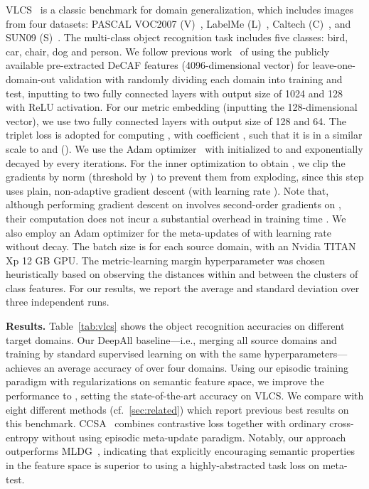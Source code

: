 \documentclass{article}
\begin{document}
VLCS~\citep{fang2013unbiased} is a classic benchmark for domain generalization, which includes images from four datasets: PASCAL VOC2007 (V)~\citep{everingham2010pascal}, LabelMe (L)~\citep{russell2008labelme}, Caltech (C)~\citep{fei2007learning}, and SUN09 (S)~\citep{choi2010exploiting}. The multi-class object recognition task includes five classes: bird, car, chair, dog and person.
We follow previous work~\citep{carlucci2019domain,li2019episodic,motiian2017unified} of using the publicly available pre-extracted DeCAF features (4096-dimensional vector) for leave-one-domain-out validation with randomly dividing each domain into  training and  test, inputting to two fully connected layers with output size of 1024 and 128 with ReLU activation.
For our metric embedding  (inputting the 128-dimensional vector), we use two fully connected layers with output size of 128 and 64. The triplet loss is adopted for computing , with coefficient , such that it is in a similar scale to  and  ().
We use the Adam optimizer~\citep{kingma2015adam} with  initialized to  and exponentially decayed by  every  iterations.
For the inner optimization to obtain , we clip the gradients by norm (threshold by ) to prevent them from exploding, since this step uses plain, non-adaptive gradient descent (with learning rate ).
Note that, although performing gradient descent on  involves second-order gradients on , their computation does not incur a substantial overhead in training time \citep{finn2017model}.
We also employ an Adam optimizer for the meta-updates of  with learning rate  without decay.
The batch size is  for each source domain, with an Nvidia TITAN Xp 12 GB GPU.
The metric-learning margin hyperparameter  was chosen heuristically based on observing the distances within and between the clusters of class features. For our results, we report the average and standard deviation over three independent runs.

\textbf{Results.} Table~\ref{tab:vlcs} shows the object recognition accuracies on different target domains. Our DeepAll baseline---i.e., merging all source domains and training  by standard supervised learning on  with the same hyperparameters---achieves an average accuracy of  over four domains. Using our episodic training paradigm with regularizations on semantic feature space, we improve the performance to , setting the
state-of-the-art accuracy on VLCS.
We compare with eight different methods (cf.~\cref{sec:related}) which report previous best results on this benchmark.
CCSA~\citep{motiian2017unified} combines contrastive loss together with ordinary cross-entropy without using episodic meta-update paradigm.
Notably, our approach outperforms MLDG~\cite{li2018learning}, indicating that explicitly encouraging semantic properties in the feature space is superior to using a highly-abstracted task loss on meta-test.
\end{document}
